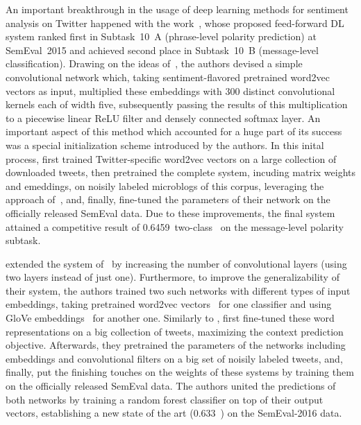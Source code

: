 
An important breakthrough in the usage of deep learning methods for
sentiment analysis on Twitter happened with the
work~\citet{Severyn:15}, whose proposed feed-forward DL system ranked
first in Subtask~10~A (phrase-level polarity prediction) at
SemEval~2015 \cite{Rosenthal:15} and achieved second place in
Subtask~10~B (message-level classification).  Drawing on the ideas
of~\citet{Kalchbrenner:14}, the authors devised a simple convolutional
network which, taking sentiment-flavored pretrained word2vec vectors
as input, multiplied these embeddings with 300 distinct convolutional
kernels each of width five, subsequently passing the results of this
multiplication to a piecewise linear ReLU filter and densely connected
softmax layer.  An important aspect of this method which accounted for
a huge part of its success was a special initialization scheme
introduced by the authors.  In this inital process,
\citeauthor{Severyn:15} first trained Twitter-specific word2vec
vectors on a large collection of downloaded tweets, then pretrained
the complete system, incuding matrix weights and emeddings, on noisily
labeled microblogs of this corpus, leveraging the approach
of~\citeauthor{Go:09}, and, finally, fine-tuned the parameters of
their network on the officially released SemEval data.  Due to these
improvements, the final system attained a competitive result of
0.6459~two-class~\F{} on the message-level polarity subtask.



\citet{Deriu:16} extended the system of~\citet{Severyn:15} by
increasing the number of convolutional layers (using two layers
instead of just one).  Furthermore, to improve the generalizability of
their system, the authors trained two such networks with different
types of input embeddings, taking pretrained word2vec
vectors~\cite{Mikolov:13} for one classifier and using GloVe
embeddings~\cite{Pennington:14} for another one.  Similarly to
\citet{Severyn:15}, \citeauthor{Deriu:16} first fine-tuned these word
representations on a big collection of tweets, maximizing the context
prediction objective.  Afterwards, they pretrained the parameters of
the networks including embeddings and convolutional filters on a big
set of noisily labeled tweets, and, finally, put the finishing touches
on the weights of these systems by training them on the officially
released SemEval data.  The authors united the predictions of both
networks by training a random forest classifier on top of their output
vectors, establishing a new state of the art (0.633~\F{}) on the
SemEval-2016 data.

